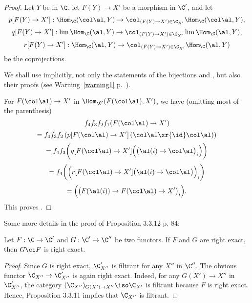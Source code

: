 \documentclass[12pt]{article}
\theoremstyle{remark}
\theoremstyle{definition}
\begin{document}
\begin{s}
\begin{proof}

Let $Y$ be in $\C$, let $F(Y)\to X'$ be a morphism in $\C'$, and let 
$$
p[F(Y)\to X']:\Hom_\C(\col\al,Y)\to\col_{(F(Y)\to X')\in\C_{X'}}\Hom_\C(\col\al,Y),
$$ 
$$
q[F(Y)\to X']:\lim\Hom_\C(\al,Y)\to\col_{(F(Y)\to X')\in\C_{X'}}\lim\Hom_\C(\al,Y),
$$ 
$$
r[F(Y)\to X']:\Hom_\C(\al,Y)\to\col_{(F(Y)\to X')\in\C_{X'}}\Hom_\C(\al,Y)
$$ 
be the coprojections.

We shall use implicitly, not only the statements of the bijections  and , but also their proofs (see Warning~\ref{warning1} p.~). 

For $F(\col\al)\to X'$ in $\Hom_{\C'}(F(\col\al),X')$, we have (omitting most of the parenthesis) 
$$
f_4f_3f_2f_1(F(\col\al)\to X')
$$ 
$$
=f_4f_3f_2\left(p[F(\col\al)\to X']\left(\col\al\xr{\id}\col\al\right)\right)
$$ 
$$
=f_4f_3\bigg(q[F(\col\al)\to X']\Big(\big(\al(i)\to\col\al\big)_i\Big)\bigg)
$$ 
$$
=f_4\bigg(\Big(r[F(\col\al)\to X']\big(\al(i)\to\col\al\big)\Big)_i\bigg)
$$ 
$$
=\Big(\big(F(\al(i))\to F(\col\al)\to X'\big)_i\Big).
$$ 
This proves .
\end{proof}  
\end{s}

%

\begin{s} Some more details in the proof of Proposition 3.3.12 p. 84:
\begin{prop}[Proposition 3.3.12 p. 84] 
Let $F:\C\to\C'$ and $G:\C'\to\C''$ be two functors. If $F$ and $G$ are right exact, then $G\ci F$ is right exact.
\end{prop}
\begin{proof}
Since $G$ is right exact, $\C'_{X''}$ is filtrant for any $X''$ in $\C''$. The obvious functor $\C_{X''}\to\C'_{X''}$ is again right exact. Indeed, for any $G(X')\to X''$ in $\C'_{X''}$, the category $(\C_{X''})_{G(X')\to X''}\iso\C_{X'}$ is filtrant because $F$ is right exact. Hence, Proposition 3.3.11 implies that $\C_{X''}$ is filtrant.
\end{proof}
\end{s}
\end{document}
